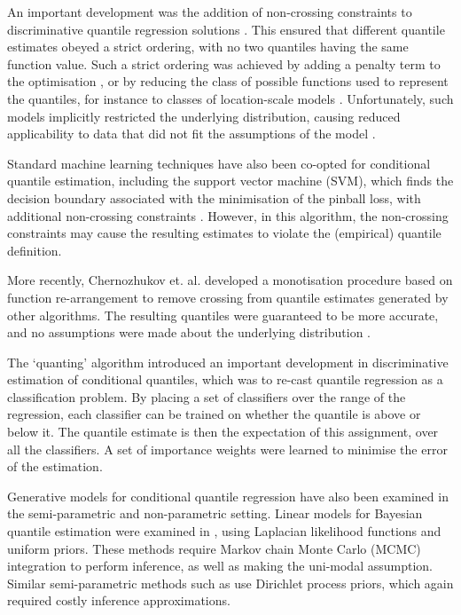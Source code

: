 \documentclass[twoside]{article} \usepackage{aistats2017}
\theoremstyle{definition}
\begin{document}
	An important development was the addition of non-crossing constraints to discriminative quantile regression solutions \citep{He1997}. This ensured that different quantile estimates obeyed a strict ordering, with no two quantiles having the same function value. Such a strict ordering was achieved by adding a penalty term to the optimisation \citep{Cole1992}, or by reducing the class of possible functions used to represent the quantiles, for instance to classes of location-scale models \citep{Koenker1984, He1997}. Unfortunately, such models implicitly restricted the underlying distribution, causing reduced applicability to data that did not fit the assumptions of the model \citep{Koenker2005}.
	
	Standard machine learning techniques have also been co-opted for conditional quantile estimation, including the support vector machine (SVM), which finds the decision boundary associated with the minimisation of the pinball loss, with additional non-crossing constraints \citep{Takeuchi2006}. However, in this algorithm, the non-crossing constraints may cause the resulting estimates to violate the (empirical) quantile definition.
	
	More recently, Chernozhukov et. al. developed a monotisation procedure based on function re-arrangement to remove crossing from quantile estimates generated by other algorithms. The resulting quantiles were guaranteed to be more accurate, and no assumptions were made about the underlying distribution \citep{Chernozhukov2010}.
	
	The `quanting' algorithm \citep{Langford2006} introduced an important development in discriminative estimation of conditional quantiles, which was to re-cast quantile regression as a classification problem. By placing a set of classifiers over the range of the regression, each classifier can be trained on whether the quantile is above or below it. The quantile estimate is then the expectation of this assignment, over all the classifiers.  A set of importance weights were learned to minimise the error of the estimation.
	
	Generative models for conditional quantile regression have also been examined in the semi-parametric and non-parametric setting. Linear models for Bayesian quantile estimation were examined in \cite{Yu2001}, using Laplacian likelihood functions and uniform priors. These methods require Markov chain Monte Carlo (MCMC) integration to perform inference, as well as making the uni-modal assumption. Similar semi-parametric methods such as \cite{Hjort2006, Hjort2009} use Dirichlet process priors, which again required costly inference approximations.
	
\end{document}
